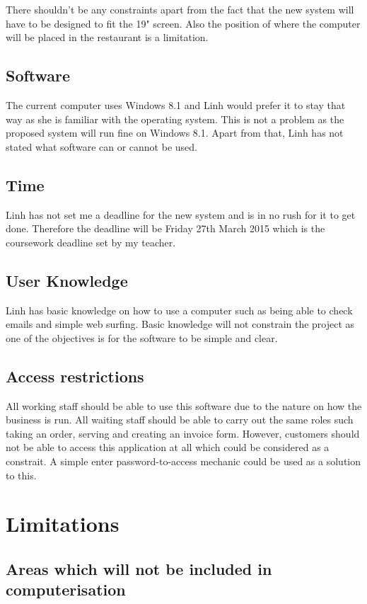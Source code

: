There shouldn't be any constraints apart from the fact that the new system will have to be designed to fit the 19" screen. Also the position of where the computer will be placed in the restaurant is a limitation.

\subsection{Software}

The current computer uses Windows 8.1 and Linh would prefer it to stay that way as she is familiar with the operating system. This is not a problem as the proposed system will run fine on Windows 8.1. Apart from that, Linh has not stated what software can or cannot be used.

\subsection{Time}
Linh has not set me a deadline for the new system and is in no rush for it to get done. Therefore the deadline will be Friday 27th March 2015 which is the coursework deadline set by my teacher.

\subsection{User Knowledge}
Linh has basic knowledge on how to use a computer such as being able to check emails and simple web surfing. Basic knowledge will not constrain the project as one of the objectives is for the software to be simple and clear.


\subsection{Access restrictions}

All working staff should be able to use this software due to the nature on how the business is run. All waiting staff should be able to carry out the same roles such taking an order, serving and creating an invoice form.    However, customers should not be able to access this application at all which could be considered as a constrait. A simple enter password-to-access mechanic could be used as a solution to this.

\section{Limitations}

\subsection{Areas which will not be included in computerisation}

